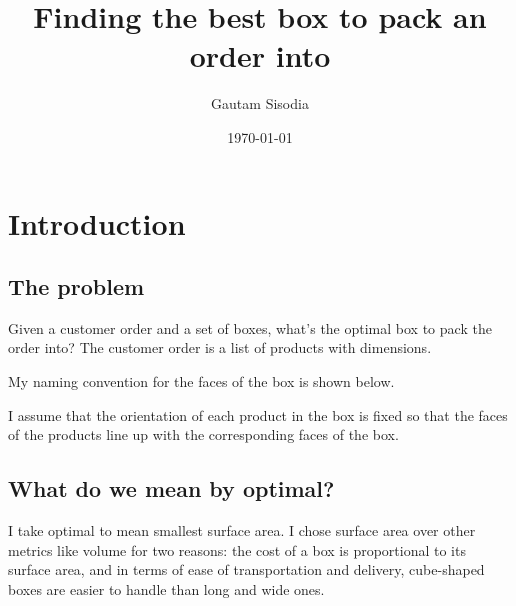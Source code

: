 \documentclass[11pt]{amsart}
\begin{document}
\title[Finding the best box to pack an order into]{Finding the best box to pack an order into}
\date{\today}
\author{Gautam Sisodia}
\maketitle

\section*{Introduction}

\subsection*{The problem}

Given a customer order and a set of boxes, what's the optimal box to pack the order into? The customer order is a list of products with dimensions.

My naming convention for the faces of the box is shown below.

\begin{figure}[h]
{}
\label{apmd}
\end{figure}

I assume that the orientation of each product in the box is fixed so that the faces of the products line up with the corresponding faces of the box.

\subsection*{What do we mean by optimal?}

I take optimal to mean smallest surface area. I chose surface area over other metrics like volume for two reasons: the cost of a box is proportional to its surface area, and in terms of ease of transportation and delivery, cube-shaped boxes are easier to handle than long and wide ones.
\end{document}
